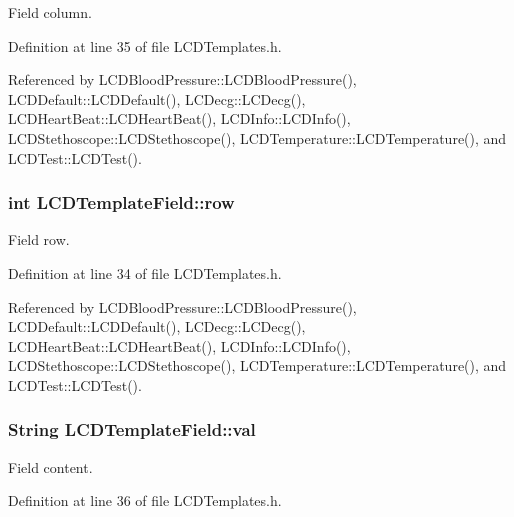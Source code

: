 Field column. 



Definition at line 35 of file L\-C\-D\-Templates.\-h.



Referenced by L\-C\-D\-Blood\-Pressure\-::\-L\-C\-D\-Blood\-Pressure(), L\-C\-D\-Default\-::\-L\-C\-D\-Default(), L\-C\-Decg\-::\-L\-C\-Decg(), L\-C\-D\-Heart\-Beat\-::\-L\-C\-D\-Heart\-Beat(), L\-C\-D\-Info\-::\-L\-C\-D\-Info(), L\-C\-D\-Stethoscope\-::\-L\-C\-D\-Stethoscope(), L\-C\-D\-Temperature\-::\-L\-C\-D\-Temperature(), and L\-C\-D\-Test\-::\-L\-C\-D\-Test().

\hypertarget{struct_l_c_d_template_field_a842db0224937e139c4ff9f9a6da123e6}{
\subsubsection[{row}]{\setlength{\rightskip}{0pt plus 5cm}int L\-C\-D\-Template\-Field\-::row}}\label{struct_l_c_d_template_field_a842db0224937e139c4ff9f9a6da123e6}


Field row. 



Definition at line 34 of file L\-C\-D\-Templates.\-h.



Referenced by L\-C\-D\-Blood\-Pressure\-::\-L\-C\-D\-Blood\-Pressure(), L\-C\-D\-Default\-::\-L\-C\-D\-Default(), L\-C\-Decg\-::\-L\-C\-Decg(), L\-C\-D\-Heart\-Beat\-::\-L\-C\-D\-Heart\-Beat(), L\-C\-D\-Info\-::\-L\-C\-D\-Info(), L\-C\-D\-Stethoscope\-::\-L\-C\-D\-Stethoscope(), L\-C\-D\-Temperature\-::\-L\-C\-D\-Temperature(), and L\-C\-D\-Test\-::\-L\-C\-D\-Test().

\hypertarget{struct_l_c_d_template_field_a6eb7ce0547fc28ac3a2538f0fac3f117}{
\subsubsection[{val}]{\setlength{\rightskip}{0pt plus 5cm}String L\-C\-D\-Template\-Field\-::val}}\label{struct_l_c_d_template_field_a6eb7ce0547fc28ac3a2538f0fac3f117}


Field content. 



Definition at line 36 of file L\-C\-D\-Templates.\-h.



